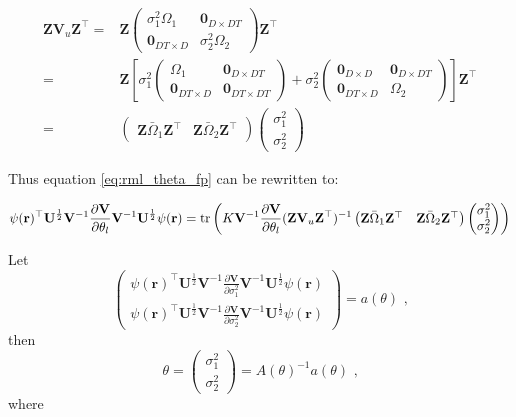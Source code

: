 \begin{align*}
\mathbf{Z}\mathbf{V}_u\mathbf{Z}^\top =& \mathbf{Z}\left(\begin{matrix}
\sigma_1^2\Omega_1 & \mathbf{0}_{D\times DT}\\
\mathbf{0}_{DT\times D} &  \sigma_2^2\Omega_2
\end{matrix}\right)\mathbf{Z}^\top \\
=& \mathbf{Z}
\left[
\sigma_1^2\left(\begin{matrix}
\Omega_1 & \mathbf{0}_{D\times DT} \\
\mathbf{0}_{DT\times D} &  \mathbf{0}_{DT\times DT}
\end{matrix}\right) + 
\sigma_2^2\left(\begin{matrix}
\mathbf{0}_{D\times D} & \mathbf{0}_{D\times DT} \\
\mathbf{0}_{DT\times D} & \Omega_2
\end{matrix}\right)
\right]\mathbf{Z}^\top \\
=& \left(\begin{matrix}\mathbf{Z}\bar{\Omega}_1\mathbf{Z}^\top & \mathbf{Z}\bar{\Omega}_2\mathbf{Z}^\top\end{matrix}\right)
\left(\begin{matrix}
\sigma_1^2 \\
\sigma_2^2
\end{matrix}\right)
\end{align*}

Thus equation \ref{eq:rml_theta_fp} can be rewritten to:

\begin{align*}
\psi(\mathbf{r})^\top\mathbf{U}^{\frac{1}{2}}\mathbf{V}^{-1}\frac{\partial\mathbf{V}}{\partial\theta_l}\mathbf{V}^{-1}\mathbf{U}^{\frac{1}{2}} \psi(\mathbf{r}) = \operatorname{tr}\left(K\mathbf{V}^{-1}\frac{\partial\mathbf{V}}{\partial\theta_l} (\mathbf{Z}\mathbf{V}_u\mathbf{Z}^\top)^{-1} \left(\begin{matrix}\mathbf{Z}\bar{\Omega}_1\mathbf{Z}^\top & \mathbf{Z}\bar{\Omega}_2\mathbf{Z}^\top\end{matrix}\right)\left(\begin{matrix}
\sigma_1^2 \\
\sigma_2^2
\end{matrix}\right)\right)
\end{align*}

Let \[
\left(\begin{matrix}
\psi(\mathbf{r})^\top\mathbf{U}^{\frac{1}{2}}\mathbf{V}^{-1}\frac{\partial\mathbf{V}}{\partial\sigma_1^2}\mathbf{V}^{-1}\mathbf{U}^{\frac{1}{2}} \psi(\mathbf{r}) \\
\psi(\mathbf{r})^\top\mathbf{U}^{\frac{1}{2}}\mathbf{V}^{-1}\frac{\partial\mathbf{V}}{\partial\sigma_2^2}\mathbf{V}^{-1}\mathbf{U}^{\frac{1}{2}} \psi(\mathbf{r})
\end{matrix}\right)
= a(\theta) \text{ ,}
\] then \[
\theta = \left(\begin{matrix}
\sigma_1^2 \\
\sigma_2^2
\end{matrix}\right) = A(\theta)^{-1} a(\theta) \text{ ,}
\] where

